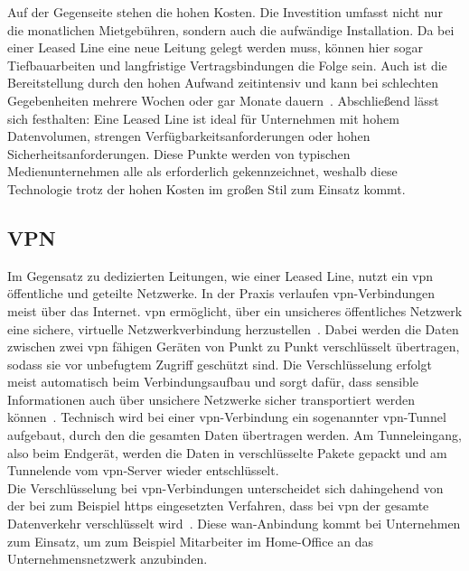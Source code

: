  Auf der Gegenseite stehen die hohen Kosten. Die Investition umfasst nicht nur die monatlichen Mietgebühren, sondern auch die aufwändige Installation. Da bei einer Leased Line eine neue Leitung gelegt werden muss, können hier sogar Tiefbauarbeiten und langfristige Vertragsbindungen die Folge sein. Auch ist die Bereitstellung durch den hohen Aufwand zeitintensiv und kann bei schlechten Gegebenheiten mehrere Wochen oder gar Monate dauern~\cite[155f]{parkNetworkDesignUsing2002}.
Abschließend lässt sich festhalten: Eine Leased Line ist ideal für Unternehmen mit hohem Datenvolumen, strengen Verfügbarkeitsanforderungen oder hohen Sicherheitsanforderungen. Diese Punkte werden von typischen Medienunternehmen alle als erforderlich gekennzeichnet, weshalb diese Technologie trotz der hohen Kosten im großen Stil zum Einsatz kommt.

\subsection*{VPN}\label{subsec:vpn}
Im Gegensatz zu dedizierten Leitungen, wie einer Leased Line, nutzt ein \ac{vpn} öffentliche und geteilte Netzwerke. In der Praxis verlaufen \ac{vpn}-Verbindungen meist über das Internet. \ac{vpn} ermöglicht, über ein unsicheres öffentliches Netzwerk eine sichere, virtuelle Netzwerkverbindung herzustellen~\cite{WieFunktioniertVirtual}. Dabei werden die Daten zwischen zwei \ac{vpn} fähigen Geräten von Punkt zu Punkt verschlüsselt übertragen, sodass sie vor unbefugtem Zugriff geschützt sind. Die Verschlüsselung erfolgt meist automatisch beim Verbindungsaufbau und sorgt dafür, dass sensible Informationen auch über unsichere Netzwerke sicher transportiert werden können~\cite{WieFunktioniertVirtual}. Technisch wird bei einer \ac{vpn}-Verbindung ein sogenannter \ac{vpn}-Tunnel aufgebaut, durch den die gesamten Daten übertragen werden. Am Tunneleingang, also beim Endgerät, werden die Daten in verschlüsselte Pakete gepackt und am Tunnelende vom \ac{vpn}-Server wieder entschlüsselt. \\
Die Verschlüsselung bei \ac{vpn}-Verbindungen unterscheidet sich dahingehend von der bei zum Beispiel \ac{https} eingesetzten Verfahren, dass bei \ac{vpn} der gesamte Datenverkehr verschlüsselt wird~\cite{WieFunktioniertVirtual}. Diese \ac{wan}-Anbindung kommt bei Unternehmen zum Einsatz, um zum Beispiel Mitarbeiter im Home-Office an das Unternehmensnetzwerk anzubinden.

